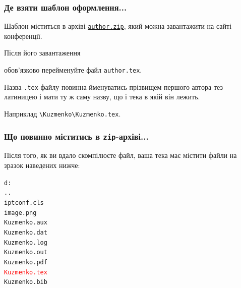 \documentclass[]{iptconf}
\def\templateurl{%
\href{https://drive.google.com/file/d/1YrrTXnwaIcydBJLFS5BM6uj-yosnkRl3/view}%
{\texttt{author.zip}}}
\begin{document}





\subsubsection*{Де взяти шаблон оформлення...}





Шаблон міститься в архіві \templateurl, який можна завантажити на сайті конференції.


Після його завантаження
\begin{tcolorbox}[breakable,enhanced,arc=0mm,colback=gray!5,colframe=red!80!black,leftrule=2mm]
	обов'язково перейменуйте файл \texttt{author.tex}.
\end{tcolorbox}

Назва \texttt{.tex}-файлу повинна йменуватись прізвищем першого автора тез латиницею і мати ту ж саму назву, що і тека в якій він лежить.

Наприклад \texttt{\textbackslash Kuzmenko\textbackslash Kuzmenko.tex}.





\subsubsection*{Що повинно міститись в \texttt{zip}-архіві...}

Після того, як ви вдало скомпілюєте файл, ваша тека має містити файли на зразок наведених нижче:

\begin{tcolorbox}[boxrule=0mm, sharpish  corners]
	\texttt{d:\string\Kuzmenko}\\
	\texttt{..}\\
	\texttt{iptconf.cls}\\
	\texttt{image.png}\\
	\texttt{Kuzmenko.aux}\\
	\texttt{Kuzmenko.dat}\\
	\texttt{Kuzmenko.log}\\
	\texttt{Kuzmenko.out}\\
	\texttt{Kuzmenko.pdf}\\
	\texttt{\textcolor{red}{Kuzmenko.tex}}\\
	\texttt{Kuzmenko.bib}
\end{tcolorbox}
\end{document}
